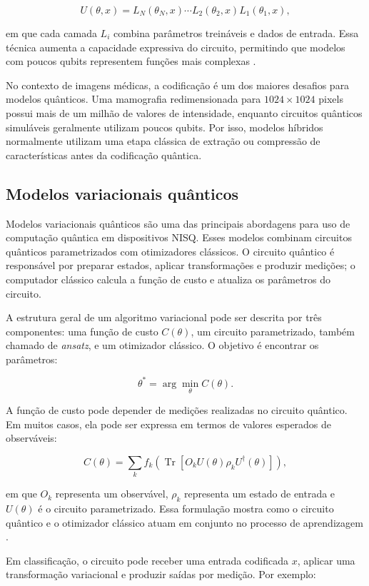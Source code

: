 \documentclass[
    12pt,
    openright,
    oneside,
    a4paper,
    english,
    brazil
]{abntex2}
\begin{document}
\[
U(\theta, x)
=
L_N(\theta_N, x)
\cdots
L_2(\theta_2, x)
L_1(\theta_1, x),
\]

em que cada camada \(L_i\) combina parâmetros treináveis e dados de entrada. Essa técnica aumenta a capacidade expressiva do circuito, permitindo que modelos com poucos qubits representem funções mais complexas \cite{perezsalinas2020data}.

No contexto de imagens médicas, a codificação é um dos maiores desafios para modelos quânticos. Uma mamografia redimensionada para \(1024 \times 1024\) pixels possui mais de um milhão de valores de intensidade, enquanto circuitos quânticos simuláveis geralmente utilizam poucos qubits. Por isso, modelos híbridos normalmente utilizam uma etapa clássica de extração ou compressão de características antes da codificação quântica.

\subsection{Modelos variacionais quânticos}

Modelos variacionais quânticos são uma das principais abordagens para uso de computação quântica em dispositivos NISQ. Esses modelos combinam circuitos quânticos parametrizados com otimizadores clássicos. O circuito quântico é responsável por preparar estados, aplicar transformações e produzir medições; o computador clássico calcula a função de custo e atualiza os parâmetros do circuito.

A estrutura geral de um algoritmo variacional pode ser descrita por três componentes: uma função de custo \(C(\theta)\), um circuito parametrizado, também chamado de \textit{ansatz}, e um otimizador clássico. O objetivo é encontrar os parâmetros:

\[
\theta^* =
\arg\min_{\theta}
C(\theta).
\]

A função de custo pode depender de medições realizadas no circuito quântico. Em muitos casos, ela pode ser expressa em termos de valores esperados de observáveis:

\[
C(\theta)
=
\sum_k
f_k
\left(
\operatorname{Tr}
[
O_k U(\theta)\rho_k U^\dagger(\theta)
]
\right),
\]

em que \(O_k\) representa um observável, \(\rho_k\) representa um estado de entrada e \(U(\theta)\) é o circuito parametrizado. Essa formulação mostra como o circuito quântico e o otimizador clássico atuam em conjunto no processo de aprendizagem \cite{cerezo2021variational}.

Em classificação, o circuito pode receber uma entrada codificada \(x\), aplicar uma transformação variacional e produzir saídas por medição. Por exemplo:
\end{document}
